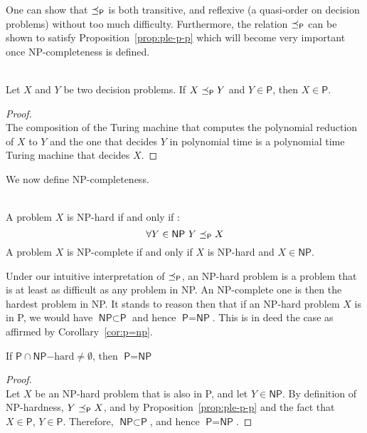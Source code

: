 One can show that \(\preceq_\textsf{P}\) is both transitive, and reflexive (a quasi-order on decision problems) without too much difficulty. Furthermore, the relation \(\preceq_\textsf{P}\) can be shown to satisfy Proposition~\ref{prop:ple-p-p} which will become very important once \textsf{NP}-completeness is defined.
\begin{proposition}\ \\
    \label{prop:ple-p-p}
    Let \(X \) and \(Y \) be two decision problems. If \(X \preceq_\textsf{P} Y\) and \(Y \in \textsf{P}\), then \(X \in \textsf{P}\).
\end{proposition}
\begin{proof}\ \\
    The composition of the Turing machine that computes the polynomial reduction of \(X\) to \(Y\) and the one that decides \(Y\) in polynomial time is a polynomial time Turing machine that decides \(X\).
\end{proof}

We now define \textsf{NP}-completeness.
\begin{definition}\ \\
    A problem \(X\) is \textsf{NP}-hard if and only if :
    \[\forall Y \in \textsf{NP}\ Y \preceq_\textsf{P} X\]
    A problem \(X\) is \textsf{NP}-complete if and only if \(X\) is \textsf{NP}-hard and \(X\in\textsf{NP}\).
\end{definition}

Under our intuitive interpretation of \(\preceq_\textsf{P}\), an \textsf{NP}-hard problem is a problem that is at least as difficult as any problem in \textsf{NP}. An \textsf{NP}-complete one is then the hardest problem in \textsf{NP}. It stands to reason then that if an \textsf{NP}-hard problem \(X\) is in \textsf{P}, we would have \(\textsf{NP} \subset \textsf{P}\) and hence \(\textsf{P}= \textsf{NP}\). This is in deed the case as affirmed by Corollary~\ref{cor:p=np}.

\begin{corollary}
    \label{cor:p=np}
    If \(\textsf{P} \cap \textsf{NP}\mathrm{-hard} \neq \emptyset\), then \(\textsf{P}=\textsf{NP}\)
\end{corollary}

\begin{proof}\ \\
    Let \(X\) be an \textsf{NP}-hard problem that is also in \textsf{P}, and let \(Y\in\textsf{NP}\). By definition of \textsf{NP}-hardness, \(Y\preceq_\textsf{P} X\), and by Proposition~\ref{prop:ple-p-p} and the fact that \(X\in\textsf{P}\), \(Y\in\textsf{P}\).
    Therefore, \(\textsf{NP} \subset \textsf{P}\), and hence \(\textsf{P}=\textsf{NP}\).
\end{proof}

